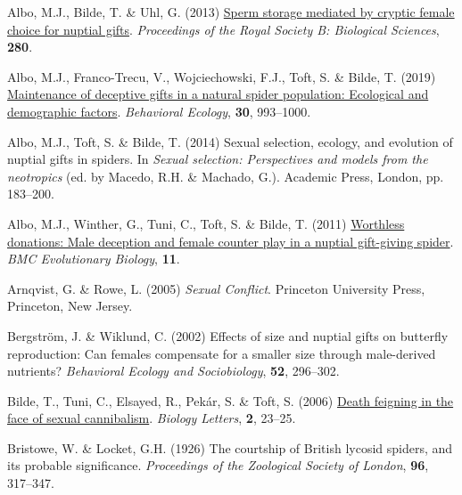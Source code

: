 \documentclass[
]{article}
\newlength{\cslhangindent}
\newlength{\cslentryspacingunit} %
\newenvironment{CSLReferences}[2] %
 {%
  \setlength{\parindent}{0pt}
  \ifodd #1
  \let\oldpar\par
  \def\par{\hangindent=\cslhangindent\oldpar}
  \fi
  \setlength{\parskip}{#2\cslentryspacingunit}
 }%
 {}
\begin{document}
\hypertarget{refs}{}
\begin{CSLReferences}{0}{0}
\leavevmode{}%
Albo, M.J., Bilde, T. \& Uhl, G. (2013)
\href{https://doi.org/10.1098/rspb.2013.1735}{{Sperm storage mediated by
cryptic female choice for nuptial gifts}}. \emph{Proceedings of the
Royal Society B: Biological Sciences}, \textbf{280}.

\leavevmode{}%
Albo, M.J., Franco-Trecu, V., Wojciechowski, F.J., Toft, S. \& Bilde, T.
(2019) \href{https://doi.org/10.1093/beheco/arz040}{{Maintenance of
deceptive gifts in a natural spider population: Ecological and
demographic factors}}. \emph{Behavioral Ecology}, \textbf{30},
993--1000.

\leavevmode{}%
Albo, M.J., Toft, S. \& Bilde, T. (2014) {Sexual selection, ecology, and
evolution of nuptial gifts in spiders}. In \emph{Sexual selection:
Perspectives and models from the neotropics} (ed. by Macedo, R.H. \&
Machado, G.). Academic Press, London, pp. 183--200.

\leavevmode{}%
Albo, M.J., Winther, G., Tuni, C., Toft, S. \& Bilde, T. (2011)
\href{https://doi.org/10.1186/1471-2148-11-329}{{Worthless donations:
Male deception and female counter play in a nuptial gift-giving
spider}}. \emph{BMC Evolutionary Biology}, \textbf{11}.

\leavevmode{}%
Arnqvist, G. \& Rowe, L. (2005) \emph{{Sexual Conflict}}. Princeton
University Press, Princeton, New Jersey.

\leavevmode{}%
Bergström, J. \& Wiklund, C. (2002) Effects of size and nuptial gifts on
butterfly reproduction: Can females compensate for a smaller size
through male-derived nutrients? \emph{Behavioral Ecology and
Sociobiology}, \textbf{52}, 296--302.

\leavevmode{}%
Bilde, T., Tuni, C., Elsayed, R., Pekár, S. \& Toft, S. (2006)
\href{https://doi.org/10.1098/rsbl.2005.0392}{{Death feigning in the
face of sexual cannibalism}}. \emph{Biology Letters}, \textbf{2},
23--25.

\leavevmode{}%
Bristowe, W. \& Locket, G.H. (1926) {The courtship of British lycosid
spiders, and its probable significance}. \emph{Proceedings of the
Zoological Society of London}, \textbf{96}, 317--347.


\end{CSLReferences}
\end{document}
